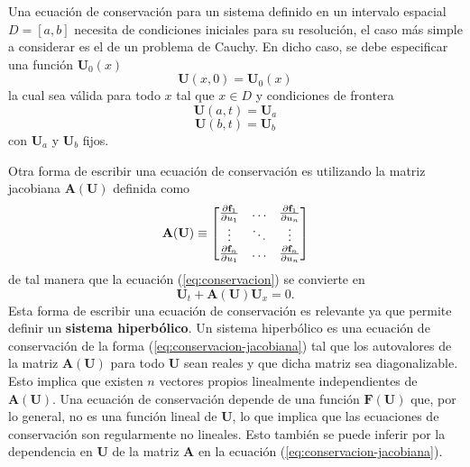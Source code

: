 Una ecuación de conservación para un sistema definido en un intervalo espacial $D = [a,b]$ necesita de condiciones iniciales para su resolución, el caso más simple a considerar es el de un problema de Cauchy. En dicho caso, se debe especificar una función $\mathbf{U}_0(x)$
\begin{equation}
	\mathbf{U}(x,0) = \mathbf{U}_0(x)
\end{equation} 
la cual sea válida para todo $x$ tal que $x \in D$ y condiciones de frontera
\begin{equation}
	\mathbf{U}(a,t) = \mathbf{U}_{a}
\end{equation}
\begin{equation}
	\mathbf{U}(b,t) = \mathbf{U}_{b}
\end{equation}
con $\mathbf{U}_{a}$ y $\mathbf{U}_{b}$ fijos.

Otra forma de escribir una ecuación de conservación es utilizando la matriz jacobiana $\mathbf{A(\mathbf{U})}$ definida como
\begin{equation}
	\mathbf{A(\mathbf{U})} \equiv
	\begin{bmatrix}
		\pdv{\mathbf{f}_1}{u_1} & \dots & \pdv{\mathbf{f}_1}{u_n} \\
		\vdots & \ddots & \vdots \\
		\pdv{\mathbf{f}_n}{u_1} & \dots & \pdv{\mathbf{f}_n}{u_n} \\
	\end{bmatrix}
\label{eq:jacobiana-A-definicion}
\end{equation}
de tal manera que la ecuación (\ref{eq:conservacion}) se convierte en
\begin{equation}
	\mathbf{U}_{t} + \mathbf{A(\mathbf{U})}\mathbf{U}_{x} = 0
	\label{eq:conservacion-jacobiana}.
\end{equation}
Esta forma de escribir una ecuación de conservación es relevante ya que permite definir un \textbf{sistema hiperbólico}. Un sistema hiperbólico es una ecuación de conservación de la forma (\ref{eq:conservacion-jacobiana}) tal que los autovalores de la matriz $\mathbf{A(\mathbf{U})}$ para todo $\mathbf{U}$ sean reales y que dicha matriz sea diagonalizable. Esto implica que existen $n$ vectores propios linealmente independientes de $\mathbf{A(\mathbf{U})}$.
Una ecuación de conservación depende de una función $\mathbf{F(\mathbf{U})}$ que, por lo general, no es una función lineal de $\mathbf{U}$, lo que implica que las ecuaciones de conservación son regularmente no lineales. Esto también se puede inferir por la dependencia en $\mathbf{U}$ de la matriz $\mathbf{A}$ en la ecuación (\ref{eq:conservacion-jacobiana}).
